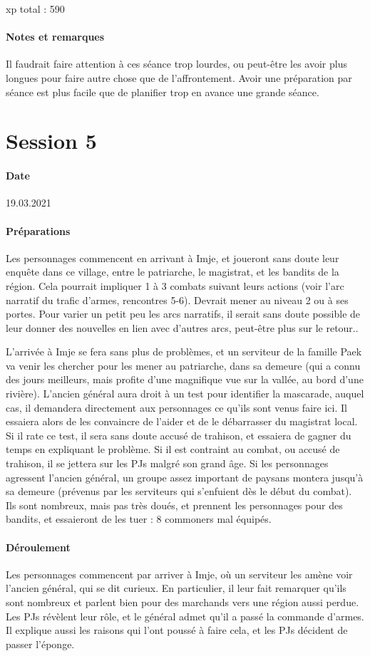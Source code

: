 \documentclass[10pt,a4paper]{book}
\begin{document}
xp total : 590
\paragraph{Notes et remarques}
Il faudrait faire attention à ces séance trop lourdes, ou peut-être les avoir plus longues pour faire autre chose que de l'affrontement. Avoir une préparation par séance est plus facile que de planifier trop en avance une grande séance.
\section{Session 5}
\paragraph{Date}19.03.2021
\paragraph{Préparations}
Les personnages commencent en arrivant à Imje, et joueront sans doute leur enquête dans ce village, entre le patriarche, le magistrat, et les bandits de la région. Cela pourrait impliquer 1 à 3 combats suivant leurs actions (voir l'arc narratif du trafic d'armes, rencontres 5-6). Devrait mener au niveau 2 ou à ses portes. Pour varier un petit peu les arcs narratifs, il serait sans doute possible de leur donner des nouvelles en lien avec d'autres arcs, peut-être plus sur le retour.. 

L'arrivée à Imje se fera sans plus de problèmes, et un serviteur de la famille Paek va venir les chercher pour les mener au patriarche, dans sa demeure (qui a connu des jours meilleurs, mais profite d'une magnifique vue sur la vallée, au bord d'une rivière). L'ancien général aura droit à un test pour identifier la mascarade, auquel cas, il demandera directement aux personnages ce qu'ils sont venus faire ici. Il essaiera alors de les convaincre de l'aider et de le débarrasser du magistrat local. Si il rate ce test, il sera sans doute accusé de trahison, et essaiera de gagner du temps en expliquant le problème. Si il est contraint au combat, ou accusé de trahison, il se jettera sur les PJs malgré son grand âge. Si les personnages agressent l'ancien général, un groupe assez important de paysans montera jusqu'à sa demeure (prévenus par les serviteurs qui s'enfuient dès le début du combat). Ils sont nombreux, mais pas très doués, et prennent les personnages pour des bandits, et essaieront de les tuer : 8 commoners mal équipés.
\paragraph{Déroulement}
Les personnages commencent par arriver à Imje, où un serviteur les amène voir l'ancien général, qui se dit curieux. En particulier, il leur fait remarquer qu'ils sont nombreux et parlent bien pour des marchands vers une région aussi perdue. Les PJs révèlent leur rôle, et le général admet qu'il a passé la commande d'armes. Il explique aussi les raisons qui l'ont poussé à faire cela, et les PJs décident de passer l'éponge.
\end{document}
